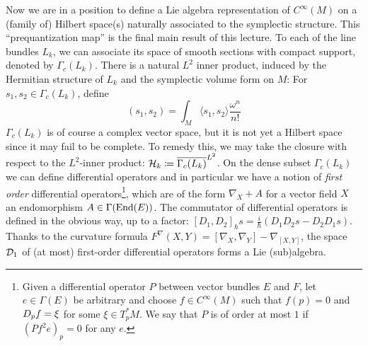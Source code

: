 \documentclass[parskip=half]{scrartcl}
\begin{document}
Now we are in a position to define a Lie algebra representation of $C^\infty(M)$ on a (family of) Hilbert space(s) naturally associated to the symplectic structure. This ``prequantization map'' is the final main result of this lecture. To each of the line bundles $L_k$, we can associate its space of smooth sections with compact support, denoted by $\Gamma_c(L_k)$. There is a natural $L^2$ inner product, induced by the Hermitian structure of $L_k$ and the symplectic volume form on $M$: For $s_1,s_2\in\Gamma_c(L_k)$, define
\begin{equation*}
	(s_1,s_2)=\int_M \langle s_1,s_2\rangle \frac{\omega^n}{n!}
\end{equation*}
$\Gamma_c(L_k)$ is of course a complex vector space, but it is not yet a Hilbert space since it may fail to be complete. To remedy this, we may take the closure with respect to the $L^2$-inner product: $\mathcal{H}_k\coloneqq \overline{\Gamma_c(L_k)}^{L^2}$. On the dense subset $\Gamma_c(L_k)$ we can define differential operators and in particular we have a notion of \emph{first order} differential operators\footnote{Given a differential operator $P$ between vector bundles $E$ and $F$, let $e\in \Gamma(E)$ be arbitrary and choose $f\in C^\infty(M)$ such that $f(p)=0$ and $D_p f=\xi$ for some $\xi\in T^*_pM$. We say that $P$ is of order at most $1$ if $(P f^{2}e)_p= 0$ for any $e$.}, which are of the form $\nabla_X+A$ for a vector field $X$ an endomorphism $A\in \Gamma(\operatorname{End}(E))$. The commutator of differential operators is defined in the obvious way, up to a factor: $[D_1,D_2]_\hbar s=\frac{i}{\hbar}(D_1D_2s-D_2D_1s)$. Thanks to the curvature formula $F^\nabla(X,Y)=[\nabla_X,\nabla_Y]-\nabla_{[X,Y]}$, the space $\mathcal{D}_1$ of (at most) first-order differential operators forms a Lie (sub)algebra.
\end{document}
